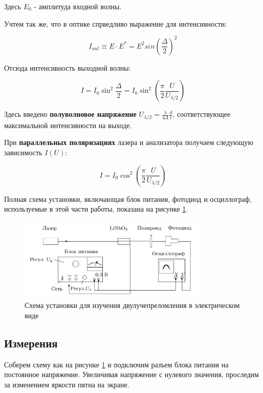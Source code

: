 \documentclass[15pt,a5paper,reqno]{article}
\begin{document}
	Здесь $E_0$ - амплитуда входной волны.
	
	Учтем так же, что в оптике спрведливо выражение для интенсивности:
	
	\[ I_{out} \equiv E\cdot E^{*} = E ^{2} sin(\frac{\Delta}{2})^{2}  \]
	
	Отсюда интенсивность выходной волны: 
	
	\begin{equation}
		I = I_0 \sin^2\frac{\Delta}{2} = I_0\sin^2 \left(\frac{\pi}{2}\frac{U}{U_{\lambda/2}}\right) 
	\end{equation}
	
	Здесь введено \textbf{полуволновое напряжение} $U_{\lambda/2} = \frac{\lambda}{4A}\frac{d}{l}$, соответствующее максимальной интенсивности на выходе.
	
	При \textbf{параллельных поляризациях} лазера и анализатора получаем следующую зависимость $I(U)$:
	
	\begin{equation}
		I = I_0 \cos^2\left(\frac{\pi}{2}\frac{U}{U_{\lambda/2}}\right)
	\end{equation} 
	
	Полная схема установки, включающая блок питания, фотодиод и осциллограф, используемые в этой части работы, показана на рисунке \ref{full}. 
	
	\begin{figure}[h]
		\centering	
		\includegraphics[width=0.8\textwidth]{pics/fullpic.png}
		\caption{Схема установки для изучения двулучепреломления в электрическом виде}
		\label{full}
	\end{figure}

    \subsection{Измерения}
	
	Соберем схему как на рисунке \ref{full} и подключим разъем блока питания на постоянное напряжение. Увеличивая напряжение с нулевого значения, проследим за изменением яркости пятна на экране. 
	
\end{document}
